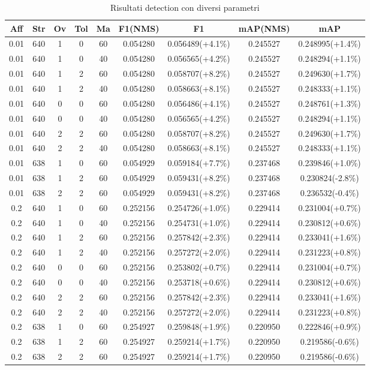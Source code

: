 \begin{table}[h!]
\centering
\begin{tabular}{|c|c|c|c|c|c|c|c|c|} 
\hline
Aff & Str & Ov & Tol & Ma & F1(NMS) & F1 & mAP(NMS) & mAP\\ [0.5ex] 
\hline
0.01 & 640 & 1 & 0 & 60 & 0.054280 & 0.056489(+4.1\%) & 0.245527 & 0.248995(+1.4\%)\\
0.01 & 640 & 1 & 0 & 40 & 0.054280 & 0.056565(+4.2\%) & 0.245527 & 0.248294(+1.1\%)\\
0.01 & 640 & 1 & 2 & 60 & 0.054280 & 0.058707(+8.2\%) & 0.245527 & 0.249630(+1.7\%)\\
0.01 & 640 & 1 & 2 & 40 & 0.054280 & 0.058663(+8.1\%) & 0.245527 & 0.248333(+1.1\%)\\
0.01 & 640 & 0 & 0 & 60 & 0.054280 & 0.056486(+4.1\%) & 0.245527 & 0.248761(+1.3\%)\\
0.01 & 640 & 0 & 0 & 40 & 0.054280 & 0.056565(+4.2\%) & 0.245527 & 0.248294(+1.1\%)\\
0.01 & 640 & 2 & 2 & 60 & 0.054280 & 0.058707(+8.2\%) & 0.245527 & 0.249630(+1.7\%)\\
0.01 & 640 & 2 & 2 & 40 & 0.054280 & 0.058663(+8.1\%) & 0.245527 & 0.248333(+1.1\%)\\
0.01 & 638 & 1 & 0 & 60 & 0.054929 & 0.059184(+7.7\%) & 0.237468 & 0.239846(+1.0\%)\\
0.01 & 638 & 1 & 2 & 60 & 0.054929 & 0.059431(+8.2\%) & 0.237468 & 0.230824(-2.8\%)\\
0.01 & 638 & 2 & 2 & 60 & 0.054929 & 0.059431(+8.2\%) & 0.237468 & 0.236532(-0.4\%)\\
0.2 & 640 & 1 & 0 & 60 & 0.252156 & 0.254726(+1.0\%) & 0.229414 & 0.231004(+0.7\%)\\
0.2 & 640 & 1 & 0 & 40 & 0.252156 & 0.254731(+1.0\%) & 0.229414 & 0.230812(+0.6\%)\\
0.2 & 640 & 1 & 2 & 60 & 0.252156 & 0.257842(+2.3\%) & 0.229414 & 0.233041(+1.6\%)\\
0.2 & 640 & 1 & 2 & 40 & 0.252156 & 0.257272(+2.0\%) & 0.229414 & 0.231223(+0.8\%)\\
0.2 & 640 & 0 & 0 & 60 & 0.252156 & 0.253802(+0.7\%) & 0.229414 & 0.231004(+0.7\%)\\
0.2 & 640 & 0 & 0 & 40 & 0.252156 & 0.253718(+0.6\%) & 0.229414 & 0.230812(+0.6\%)\\
0.2 & 640 & 2 & 2 & 60 & 0.252156 & 0.257842(+2.3\%) & 0.229414 & 0.233041(+1.6\%)\\
0.2 & 640 & 2 & 2 & 40 & 0.252156 & 0.257272(+2.0\%) & 0.229414 & 0.231223(+0.8\%)\\
0.2 & 638 & 1 & 0 & 60 & 0.254927 & 0.259848(+1.9\%) & 0.220950 & 0.222846(+0.9\%)\\
0.2 & 638 & 1 & 2 & 60 & 0.254927 & 0.259214(+1.7\%) & 0.220950 & 0.219586(-0.6\%)\\
0.2 & 638 & 2 & 2 & 60 & 0.254927 & 0.259214(+1.7\%) & 0.220950 & 0.219586(-0.6\%)\\
\hline
\end{tabular}
\caption{Risultati detection con diversi parametri}
\label{risultati detection con diversi parametri}
\end{table}
